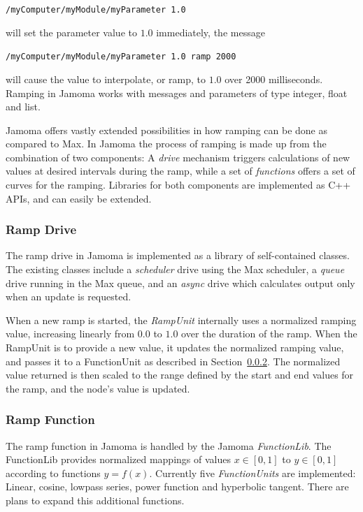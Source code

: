 \documentclass{NIME-alternate}
\begin{document}
\texttt{/myComputer/myModule/myParameter 1.0}

\noindent
will set the parameter value to $1.0$ immediately, the message

\texttt{/myComputer/myModule/myParameter 1.0 ramp 2000}

\noindent
will cause the value to interpolate, or ramp, to $1.0$ over 2000 milliseconds. Ramping in Jamoma works with messages and parameters of type integer, float and list.

Jamoma offers vastly extended possibilities in how ramping can be done as compared to Max. In Jamoma the process of ramping is made up from the combination of two components: A \emph{drive} mechanism triggers calculations of new values at desired intervals during the ramp, while a set of \emph{functions} offers a set of curves for the ramping. Libraries for both components are implemented as C++ APIs, and can easily be extended.


\subsubsection{Ramp Drive} %
\label{ssub:the_ramp_lib}

The ramp drive in Jamoma is implemented as a library of self-contained classes.  The existing classes include a \emph{scheduler} drive using the Max scheduler, a \emph{queue} drive running in the Max queue, and an \emph{async} drive which calculates output only when an update is requested.

When a new ramp is started, the \emph{RampUnit} internally uses a normalized ramping value, increasing linearly from $0.0$ to $1.0$ over the duration of the ramp. When the RampUnit is to provide a new value, it updates the normalized ramping value, and passes it to a FunctionUnit as described in Section~\ref{ssub:the_function_lib}. The normalized value returned is then scaled to the range defined by the start and end values for the ramp, and the node's value is updated.



\subsubsection{Ramp Function} %
\label{ssub:the_function_lib}

The ramp function in Jamoma is handled by the Jamoma \emph{FunctionLib}.  The FunctionLib provides normalized mappings of values $x \in [0,1]$ to $y \in [0,1]$ according to functions $y = f(x)$. Currently five \emph{FunctionUnits} are implemented: Linear, cosine, lowpass series, power function and hyperbolic tangent. There are plans to expand this additional functions.
\end{document}
